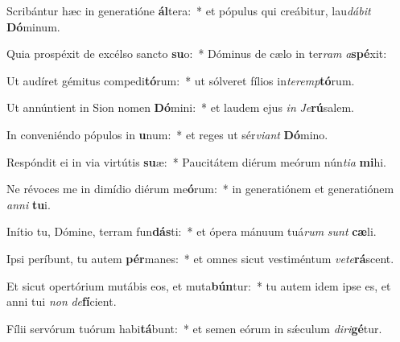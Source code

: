 \item Scribántur hæc in generatióne \textbf{ál}tera:~* et pópulus qui creábitur, lau\textit{dá}\textit{bit} \textbf{Dó}minum.
\item Quia prospéxit de excélso sancto \textbf{su}o:~* Dóminus de cælo in ter\textit{ram} \textit{a}\textbf{spé}xit:
\item Ut audíret gémitus compedi\textbf{tó}rum:~* ut sólveret fílios in\textit{ter}\textit{emp}\textbf{tó}rum.
\item Ut annúntient in Sion nomen \textbf{Dó}mini:~* et laudem ejus \textit{in} \textit{Je}\textbf{rú}salem.
\item In conveniéndo pópulos in \textbf{u}num:~* et reges ut sér\textit{vi}\textit{ant} \textbf{Dó}mino.
\item Respóndit ei in via virtútis \textbf{su}æ:~* Paucitátem diérum meórum nún\textit{ti}\textit{a} \textbf{mi}hi.
\item Ne révoces me in dimídio diérum me\textbf{ó}rum:~* in generatiónem et generatiónem \textit{an}\textit{ni} \textbf{tu}i.
\item Inítio tu, Dómine, terram fun\textbf{dás}ti:~* et ópera mánuum tuá\textit{rum} \textit{sunt} \textbf{cæ}li.
\item Ipsi períbunt, tu autem \textbf{pér}manes:~* et omnes sicut vestiméntum \textit{ve}\textit{te}\textbf{rá}scent.
\item Et sicut opertórium mutábis eos, et muta\textbf{bún}tur:~* tu autem idem ipse es, et anni tui \textit{non} \textit{de}\textbf{fí}cient.
\item Fílii servórum tuórum habi\textbf{tá}bunt:~* et semen eórum in sǽculum \textit{di}\textit{ri}\textbf{gé}tur.

